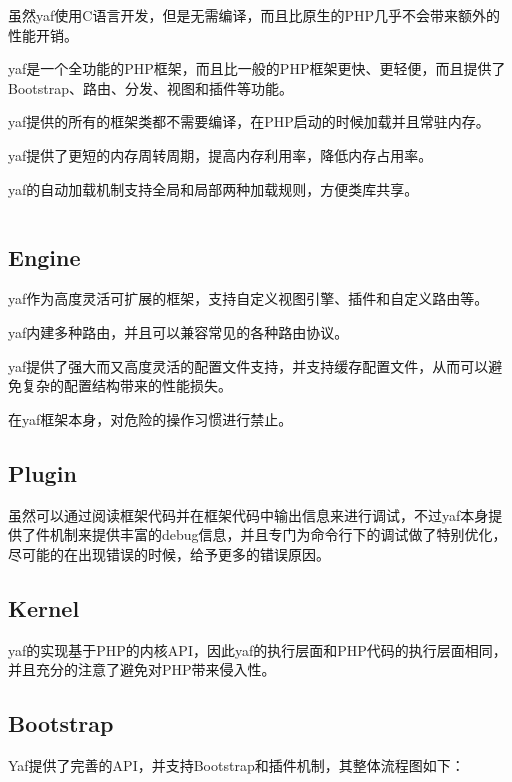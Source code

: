虽然yaf使用C语言开发，但是无需编译，而且比原生的PHP几乎不会带来额外的性能开销。

yaf是一个全功能的PHP框架，而且比一般的PHP框架更快、更轻便，而且提供了Bootstrap、路由、分发、视图和插件等功能。

yaf提供的所有的框架类都不需要编译，在PHP启动的时候加载并且常驻内存。

yaf提供了更短的内存周转周期，提高内存利用率，降低内存占用率。

yaf的自动加载机制支持全局和局部两种加载规则，方便类库共享。


\begin{lstlisting}[language=PHP]

\end{lstlisting}


\subsection{Engine}

yaf作为高度灵活可扩展的框架，支持自定义视图引擎、插件和自定义路由等。

yaf内建多种路由，并且可以兼容常见的各种路由协议。

yaf提供了强大而又高度灵活的配置文件支持，并支持缓存配置文件，从而可以避免复杂的配置结构带来的性能损失。

在yaf框架本身，对危险的操作习惯进行禁止。

\subsection{Plugin}

虽然可以通过阅读框架代码并在框架代码中输出信息来进行调试，不过yaf本身提供了件机制来提供丰富的debug信息，并且专门为命令行下的调试做了特别优化，尽可能的在出现错误的时候，给予更多的错误原因。


\subsection{Kernel}

yaf的实现基于PHP的内核API，因此yaf的执行层面和PHP代码的执行层面相同，并且充分的注意了避免对PHP带来侵入性。



\subsection{Bootstrap}

Yaf提供了完善的API，并支持Bootstrap和插件机制，其整体流程图如下：

